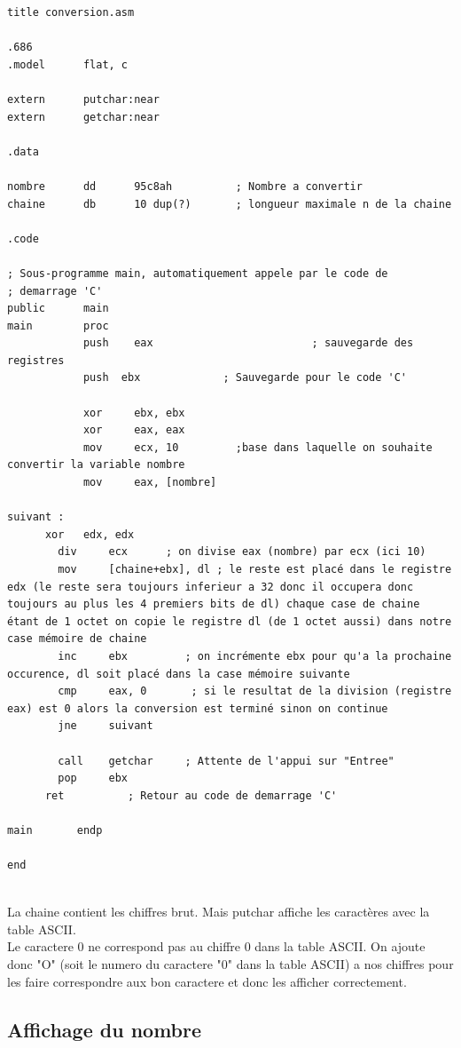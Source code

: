 \documentclass[11pt]{report}
\begin{document}
\begin{lstlisting}
title conversion.asm

.686
.model 		flat, c

extern      putchar:near
extern      getchar:near

.data

nombre      dd      95c8ah          ; Nombre a convertir
chaine      db      10 dup(?)       ; longueur maximale n de la chaine

.code

; Sous-programme main, automatiquement appele par le code de
; demarrage 'C'
public      main
main        proc
			push 	eax							; sauvegarde des registres
			push  ebx             ; Sauvegarde pour le code 'C'

			xor		ebx, ebx
			xor		eax, eax
			mov		ecx, 10         ;base dans laquelle on souhaite convertir la variable nombre
			mov		eax, [nombre]

suivant :
      xor 	edx, edx
	    div	    ecx      ; on divise eax (nombre) par ecx (ici 10)
	    mov     [chaine+ebx], dl ; le reste est placé dans le registre edx (le reste sera toujours inferieur a 32 donc il occupera donc toujours au plus les 4 premiers bits de dl) chaque case de chaine étant de 1 octet on copie le registre dl (de 1 octet aussi) dans notre case mémoire de chaine
	    inc     ebx         ; on incrémente ebx pour qu'a la prochaine occurence, dl soit placé dans la case mémoire suivante
	    cmp     eax, 0       ; si le resultat de la division (registre eax) est 0 alors la conversion est terminé sinon on continue
	    jne     suivant

	    call    getchar     ; Attente de l'appui sur "Entree"
	    pop     ebx
      ret          ; Retour au code de demarrage 'C'

main       endp

end


\end{lstlisting}

La chaine contient les chiffres brut. Mais putchar affiche les caractères avec la table ASCII.
\\Le caractere 0 ne correspond pas au chiffre 0 dans la table ASCII. On ajoute donc "O" (soit le numero du caractere "0" dans la table ASCII) a nos chiffres pour les faire correspondre aux bon caractere et donc les afficher correctement.

\subsection{Affichage du nombre}
\end{document}
